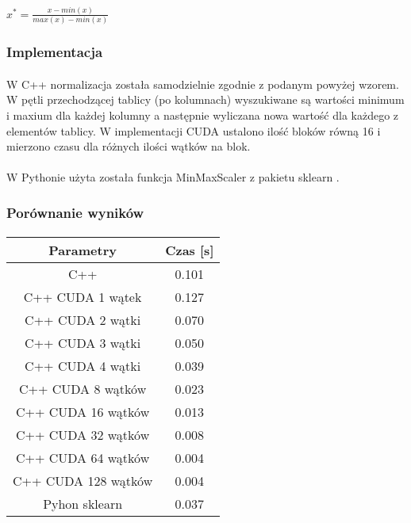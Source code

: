 \documentclass[a4paper,11pt]{article}
\begin{document}
\paragraph{}$x^*=\frac{x-min(x)}{max(x)-min(x)}$
\subsubsection{Implementacja} 
\paragraph{}W C++ normalizacja została samodzielnie zgodnie z podanym powyżej wzorem. W pętli przechodzącej tablicy (po kolumnach) wyszukiwane są wartości minimum i maxium dla każdej kolumny a następnie wyliczana nowa wartość dla każdego z elementów tablicy. W implementacji CUDA ustalono ilość bloków równą 16 i mierzono czasu dla różnych ilości wątków na blok.

\paragraph{}W Pythonie użyta została funkcja MinMaxScaler z pakietu sklearn .
\subsubsection{Porównanie wyników} 
\paragraph{}
\begin{tabular}{|c|c|}
\hline Parametry&Czas [s] \\ 
\hline C++ & 0.101 \\
\hline C++ CUDA 1 wątek& 0.127 \\
\hline C++ CUDA 2 wątki& 0.070 \\
\hline C++ CUDA 3 wątki& 0.050 \\
\hline C++ CUDA 4 wątki& 0.039 \\
\hline C++ CUDA 8 wątków& 0.023 \\
\hline C++ CUDA 16 wątków& 0.013 \\
\hline C++ CUDA 32 wątków& 0.008 \\
\hline C++ CUDA 64 wątków& 0.004 \\
\hline C++ CUDA 128 wątków& 0.004 \\
\hline
\hline Pyhon sklearn& 0.037 \\
\hline
\end{tabular}
\end{document}
